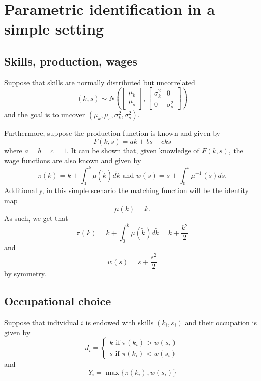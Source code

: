 \documentclass{article}
\title{}
\author{}
\date{}
\begin{document}
\section*{Parametric identification in a simple setting}
\subsection*{Skills, production, wages}
Suppose that skills are normally distributed but uncorrelated
\begin{equation*}
	(k,s) \sim N\left(\begin{bmatrix}
		\mu_k\\
		\mu_s
	\end{bmatrix},
	\begin{bmatrix}
			\sigma_k^2 & 0 \\
		0 & \sigma_s^2
	\end{bmatrix}\right)
\end{equation*}
and the goal is to uncover $(\mu_k,\mu_s,\sigma_k^2,\sigma_s^2)$.


Furthermore, suppose the production function is known and given by
\begin{equation*}
	F(k,s) = ak + bs + cks
\end{equation*}
where $a=b=c=1$. It can be shown that, given knowledge of $F(k,s)$, the wage functions are also known and given by
\begin{equation*}
	\pi(k) = k + \int_0^k\mu(\tilde{k})d\tilde{k} \text{ and } w(s) = s + \int_0^s\mu^{-1}(\tilde{s})d\tilde{s}.
\end{equation*}
Additionally, in this simple scenario the matching function will be the identity map
\begin{equation*}
	\mu(k) = k.
\end{equation*}
As such, we get that
\begin{equation*}
	\pi(k) = k + \int_0^k\mu(\tilde{k})d\tilde{k} = k +\frac{k^2}{2}
\end{equation*}
and 
\begin{equation*}
	w(s) = s + \frac{s^2}{2}
\end{equation*}
by symmetry.
\subsection*{Occupational choice}
Suppose that individual $i$ is endowed with skills $(k_i,s_i)$ and their occupation is given by
\begin{equation*}
	J_i = 
	\begin{cases}
		k \text{ if } \pi(k_i) > w(s_i)\\
		s \text{ if } \pi(k_i) < w(s_i)
	\end{cases}
\end{equation*}
and
\begin{equation*}
	Y_i = \max\{\pi(k_i),w(s_i)\}
\end{equation*}
\end{document}
